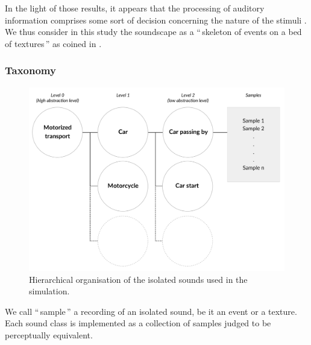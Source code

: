 \documentclass[12pt]{elsarticle}
\newcommand{\ie}{\emph{i.\,e.}}
\newcommand{\cf}{cf.}
\newcommand{\myfloatalign}{\centering}
\begin{document}
In the light of those results, it appears that the processing of auditory information comprises some sort of decision concerning the nature of the stimuli \cite{nelken2013ear,mcdermott2013summary}. We thus consider in this study the soundscape as a ``\,skeleton of events on a bed of textures\,'' as coined in \cite{nelken2013ear}.

\subsubsection*{Taxonomy}

\begin{figure}[t]
        \myfloatalign
        \includegraphics[width=.8\linewidth]{gfx/3.pdf}
       \caption{Hierarchical organisation of the isolated sounds used in the simulation.}\label{fig:orgDb}
\end{figure}


We call ``\,sample\,'' a recording of an isolated sound, be it an event or a texture. Each sound class is implemented as a collection of samples judged to be perceptually equivalent.

\end{document}
